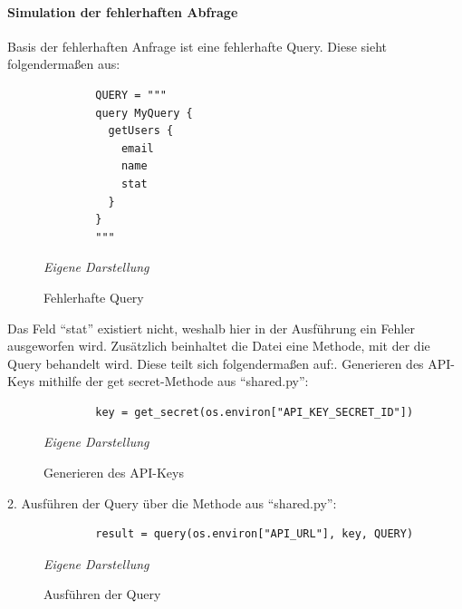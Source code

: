 	\paragraph{Simulation der fehlerhaften Abfrage}
	Basis der fehlerhaften Anfrage ist eine fehlerhafte Query. Diese sieht folgendermaßen aus:\newline
		\begin{figure}[H]
		\centering
		\begin{minipage}[t]{.7\textwidth} %
		\caption{Fehlerhafte Query} %
		\begin{verbatim}
		QUERY = """
		query MyQuery {
		  getUsers {
		    email
		    name
		    stat
		  }
		}
		"""
		\end{verbatim}
		
		\textit{Eigene Darstellung} %
		\label{fig:fehlerhafteQuery}
		\end{minipage}
		\end{figure}
	Das Feld ``stat'' existiert nicht, weshalb hier in der Ausführung ein Fehler ausgeworfen wird. 
	\newline
	Zusätzlich beinhaltet die Datei eine Methode, mit der die Query behandelt wird. Diese teilt sich folgendermaßen auf:. Generieren des API-Keys mithilfe der get secret-Methode aus ``shared.py'':\newline
		\begin{figure}[H]
		\centering
		\begin{minipage}[t]{.7\textwidth} %
		\caption{Generieren des API-Keys} %
		\begin{verbatim}
		key = get_secret(os.environ["API_KEY_SECRET_ID"])
		\end{verbatim}
		
		\textit{Eigene Darstellung} %
		\label{fig:apiKeyGenerierung}
		\end{minipage}
		\end{figure}
	2. Ausführen der Query über die Methode aus  ``shared.py'':\newline
		\begin{figure}[H]
		\centering
		\begin{minipage}[t]{.7\textwidth} %
		\caption{Ausführen der Query} %
		\begin{verbatim}
		result = query(os.environ["API_URL"], key, QUERY)
		\end{verbatim}
		
		\textit{Eigene Darstellung} %
		\label{fig:queryAusführung}
		\end{minipage}
		\end{figure}
